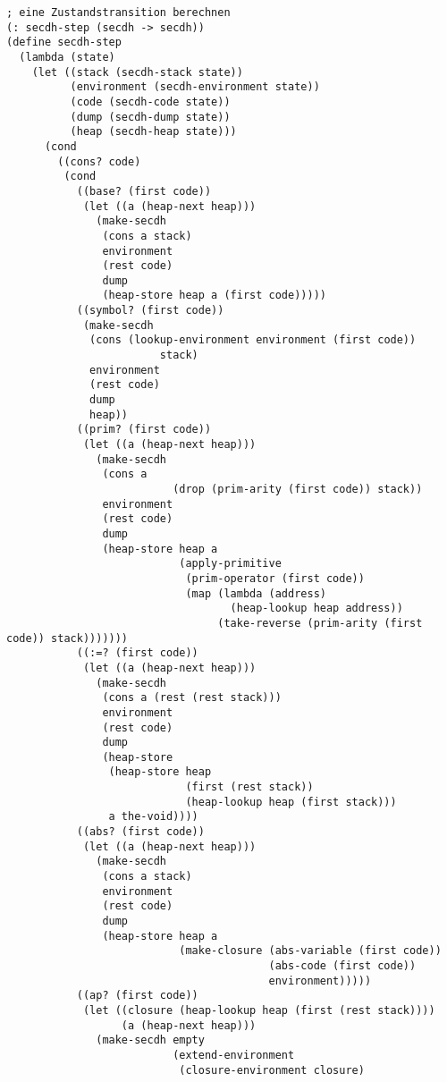 \begin{verbatim}
; eine Zustandstransition berechnen
(: secdh-step (secdh -> secdh))
(define secdh-step
  (lambda (state)
    (let ((stack (secdh-stack state))
          (environment (secdh-environment state))
          (code (secdh-code state))
          (dump (secdh-dump state))
          (heap (secdh-heap state)))
      (cond
        ((cons? code)
         (cond
           ((base? (first code))
            (let ((a (heap-next heap)))
              (make-secdh
               (cons a stack)
               environment
               (rest code)
               dump
               (heap-store heap a (first code)))))
           ((symbol? (first code))
            (make-secdh
             (cons (lookup-environment environment (first code))
                        stack)
             environment
             (rest code)
             dump
             heap))
           ((prim? (first code))
            (let ((a (heap-next heap)))
              (make-secdh
               (cons a
                          (drop (prim-arity (first code)) stack))
               environment
               (rest code)
               dump
               (heap-store heap a
                           (apply-primitive
                            (prim-operator (first code))
                            (map (lambda (address)
                                   (heap-lookup heap address))
                                 (take-reverse (prim-arity (first code)) stack)))))))
           ((:=? (first code))
            (let ((a (heap-next heap)))
              (make-secdh
               (cons a (rest (rest stack)))
               environment
               (rest code)
               dump
               (heap-store
                (heap-store heap
                            (first (rest stack)) 
                            (heap-lookup heap (first stack)))
                a the-void))))
           ((abs? (first code))
            (let ((a (heap-next heap)))
              (make-secdh
               (cons a stack)
               environment
               (rest code)
               dump
               (heap-store heap a
                           (make-closure (abs-variable (first code))
                                         (abs-code (first code))
                                         environment)))))
           ((ap? (first code))
            (let ((closure (heap-lookup heap (first (rest stack))))
                  (a (heap-next heap)))
              (make-secdh empty
                          (extend-environment
                           (closure-environment closure)

\end{verbatim}

